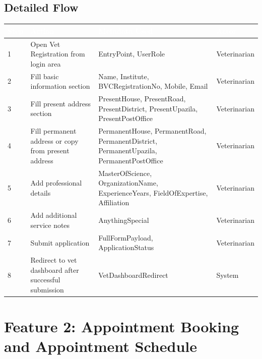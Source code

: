 \documentclass[12pt]{article}
\begin{document}
\subsection{Detailed Flow}

\begin{longtable}{|p{1.2cm}|p{5.6cm}|p{5.7cm}|p{2cm}|}
\hline
\rowcolor{headerblue}\textcolor{white}{\textbf{Step}} & \textcolor{white}{\textbf{Action}} & \textcolor{white}{\textbf{Metadata Used}} & \textcolor{white}{\textbf{Actor}} \\
\hline
1 & Open Vet Registration from login area & EntryPoint, UserRole & Veterinarian \\
\hline
\rowcolor{rowgray}
2 & Fill basic information section & Name, Institute, BVCRegistrationNo, Mobile, Email & Veterinarian \\
\hline
3 & Fill present address section & PresentHouse, PresentRoad, PresentDistrict, PresentUpazila, PresentPostOffice & Veterinarian \\
\hline
\rowcolor{rowgray}
4 & Fill permanent address or copy from present address & PermanentHouse, PermanentRoad, PermanentDistrict, PermanentUpazila, PermanentPostOffice & Veterinarian \\
\hline
5 & Add professional details & MasterOfScience, OrganizationName, ExperienceYears, FieldOfExpertise, Affiliation & Veterinarian \\
\hline
\rowcolor{rowgray}
6 & Add additional service notes & AnythingSpecial & Veterinarian \\
\hline
7 & Submit application & FullFormPayload, ApplicationStatus & Veterinarian \\
\hline
\rowcolor{rowgray}
8 & Redirect to vet dashboard after successful submission & VetDashboardRedirect & System \\
\hline
\end{longtable}

\newpage
\section{Feature 2: Appointment Booking and Appointment Schedule}
\end{document}
